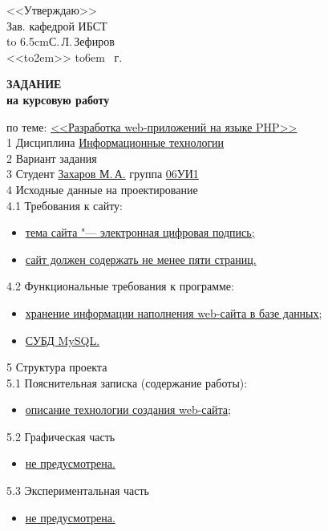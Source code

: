 \hfill\parbox{6.5cm}{<<Утверждаю>>\\
  Зав. кафедрой ИБСТ\\
  \hbox to 6.5cm{\hrulefill С.\,Л.\,Зефиров}\\
  \def\hrf#1{\hbox to#1{\hrulefill}}
  <<\hrf{2em}>> \hrf{6em} \the\year~г.}	
	
\begin{center}\textbf{\normalfont\bfseries\large ЗАДАНИЕ}\\\textbf{на
    курсовую работу}\end{center}

\noindent по теме: \uline{<<Разработка web-приложений на языке PHP>>\hfill}\\
1 Дисциплина \uline{\qquad Информационные технологии\hfill}\\
2 Вариант задания \uline{\hfill}\\
3 Студент \uline{\qquad Захаров М.\,А.\qquad } группа \uline{\qquad 06УИ1\hfill}\\
4 Исходные данные на проектирование\\
4.1 Требования к сайту:
\begin{itemize}
\item \uline{тема сайта "--- электронная цифровая подпись;\hfill\quad}
\item \uline{сайт должен содержать не менее пяти страниц.\hfill\quad}
\end{itemize}
4.2 Функциональные требования к программе:
\begin{itemize}
\item \uline{хранение информации наполнения web-сайта в базе данных;
    \hfill \quad}
\item \uline{СУБД MySQL.\hfill \quad}
\end{itemize}
5 Структура проекта\\
5.1 Пояснительная записка (содержание работы):
\begin{itemize}
\item \uline{описание технологии создания web-сайта; \hfill \quad}
\end{itemize}
5.2 Графическая часть
\begin{itemize}
\item \uline{не предусмотрена.\hfill}
\end{itemize}
5.3 Экспериментальная часть
\begin{itemize}
\item \uline{не предусмотрена.\hfill}
\end{itemize}
